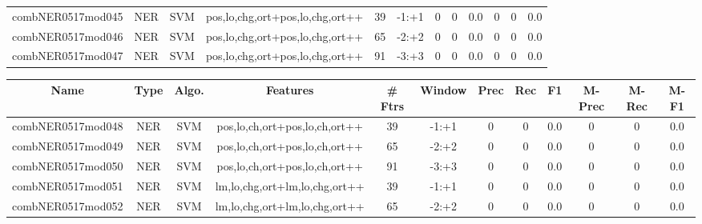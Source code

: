 \documentclass[a4paper]{article}
\begin{document}
\begin{landscape}
\begin{center}
\begin{tabular}{ |c|c|c|c|c|c|c|c|c|c|c|c|}
 
 	
 	\small{ combNER0517mod045 } & \small{ NER} & \small{  SVM }  & pos,lo,chg,ort+pos,lo,chg,ort++  &  39 &  \small{  -1:+1 }  &  0 & 0 & 0.0  &  0 & 0 & 0.0 \\
 	

 
 	
 	\small{ combNER0517mod046 } & \small{ NER} & \small{  SVM }  & pos,lo,chg,ort+pos,lo,chg,ort++  &  65 &  \small{  -2:+2 }  &  0 & 0 & 0.0  &  0 & 0 & 0.0 \\
 	

 
 	
 	\small{ combNER0517mod047 } & \small{ NER} & \small{  SVM }  & pos,lo,chg,ort+pos,lo,chg,ort++  &  91 &  \small{  -3:+3 }  &  0 & 0 & 0.0  &  0 & 0 & 0.0 \\
 	
 \hline
\end{tabular}
\end{center}




\begin{center}
\begin{tabular}{ |c|c|c|c|c|c|c|c|c|c|c|c|} 
 \hline
 	Name & Type & Algo. & Features & \# Ftrs & Window & Prec & Rec & F1 & M-Prec & M-Rec & M-F1\\
 \hline

 	

 
 	
 	\small{ combNER0517mod048 } & \small{ NER} & \small{  SVM }  & pos,lo,ch,ort+pos,lo,ch,ort++  &  39 &  \small{  -1:+1 }  &  0 & 0 & 0.0  &  0 & 0 & 0.0 \\
 	

 
 	
 	\small{ combNER0517mod049 } & \small{ NER} & \small{  SVM }  & pos,lo,ch,ort+pos,lo,ch,ort++  &  65 &  \small{  -2:+2 }  &  0 & 0 & 0.0  &  0 & 0 & 0.0 \\
 	

 
 	
 	\small{ combNER0517mod050 } & \small{ NER} & \small{  SVM }  & pos,lo,ch,ort+pos,lo,ch,ort++  &  91 &  \small{  -3:+3 }  &  0 & 0 & 0.0  &  0 & 0 & 0.0 \\
 	

 
 	
 	\small{ combNER0517mod051 } & \small{ NER} & \small{  SVM }  & lm,lo,chg,ort+lm,lo,chg,ort++  &  39 &  \small{  -1:+1 }  &  0 & 0 & 0.0  &  0 & 0 & 0.0 \\
 	

 
 	
 	\small{ combNER0517mod052 } & \small{ NER} & \small{  SVM }  & lm,lo,chg,ort+lm,lo,chg,ort++  &  65 &  \small{  -2:+2 }  &  0 & 0 & 0.0  &  0 & 0 & 0.0 \\
 	


\end{tabular}
\end{center}
\end{landscape}
\end{document}
